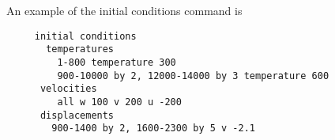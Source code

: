 \documentclass[11pt]{report}
\numberwithin{equation}{section}
\newcommand{\nin} {\noindent}
\begin{document}
\nin An example of the initial conditions command is
\small
\begin{verbatim}
     initial conditions
       temperatures
         1-800 temperature 300
         900-10000 by 2, 12000-14000 by 3 temperature 600
      velocities
         all w 100 v 200 u -200
      displacements
        900-1400 by 2, 1600-2300 by 5 v -2.1
\end{verbatim}
 \normalsize

\end{document}
